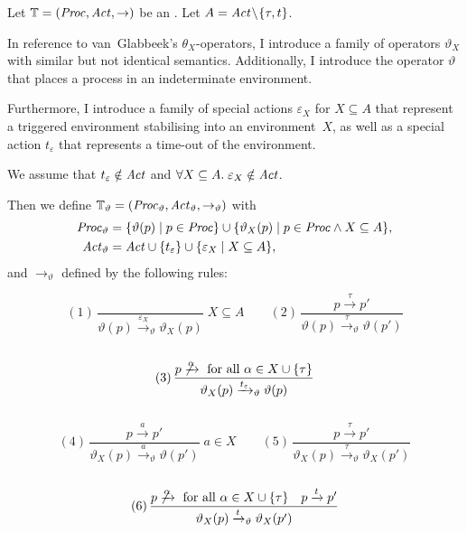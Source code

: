 %
\begin{isabellebody}%
%
%
\isadelimtheory
%
\endisadelimtheory
%
\isatagtheory
%
\endisatagtheory
{\isafoldtheory}%
%
\isadelimtheory
%
\endisadelimtheory
%
\isadelimdocument
%
\endisadelimdocument
%
\isatagdocument
%
\isamarkuptrue%
%
\endisatagdocument
{\isafolddocument}%
%
\isadelimdocument
%
\endisadelimdocument
%
\begin{isamarkuptext}%
\label{sec:mapping_lts}%
\end{isamarkuptext}\isamarkuptrue%
%
\begin{isamarkuptext}%
Let $\mathbb{T} = (\mathit{Proc}, \mathit{Act}, \rightarrow)$ be an \LTSt{}. Let $A = \mathit{Act} \!\setminus\! \{\tau, t\}$.

In reference to van~Glabbeek's $\theta_X$-operators, I introduce a family of operators $\vartheta_X$ with similar but not identical semantics. Additionally, I introduce the operator $\vartheta$ that places a process in an indeterminate environment.

Furthermore, I introduce a family of special actions $\varepsilon_X$ for $X \subseteq A$ that represent a triggered environment stabilising into an environment~$X$, as well as a special action $t_\varepsilon$ that represents a time-out of the environment.

We assume that $t_\varepsilon \notin \mathit{Act}$ and $\forall X \subseteq A.\; \varepsilon_X \notin \mathit{Act}$. 

Then we define $\mathbb{T}_\vartheta = (\mathit{Proc}_\vartheta, \mathit{Act}_\vartheta, \rightarrow_\vartheta)$ with
\begin{align*}
    \mathit{Proc}_\vartheta &= \{ \vartheta(p) \mid p \in \mathit{Proc} \} \cup \{ \vartheta_X(p) \mid p \in \mathit{Proc} \wedge X \subseteq A \}, \\
    \mathit{Act}_\vartheta &= \mathit{Act} \cup \{t_\varepsilon\} \cup \{ \varepsilon_X \mid X \subseteq A \},
\end{align*}
and $\rightarrow_\vartheta$ defined by the following rules:

$$
(1)\,\frac{}{\vartheta(p) \xrightarrow{\varepsilon_X}_\vartheta \vartheta_X(p)} \; X \subseteq A
\qquad
(2)\,\frac{p \xrightarrow{\tau} p'}{\vartheta(p) \xrightarrow{\tau}_\vartheta \vartheta(p')}
$$
\\[-5pt]
$$
(3)\,\frac{p \not\xrightarrow{\alpha} \text{ for all } \alpha \in X \cup \{\tau\}}
{\vartheta_X(p) \xrightarrow{t_\varepsilon}_\vartheta \vartheta(p)}
$$
\\[-5pt]
$$
(4)\,\frac{p \xrightarrow{a} p'}{\vartheta_X(p) \xrightarrow{a}_\vartheta \vartheta(p')} \; a \in X
\qquad
(5)\,\frac{p \xrightarrow{\tau} p'}{\vartheta_X(p) \xrightarrow{\tau}_\vartheta \vartheta_X(p')}
$$
\\[-5pt]
$$
(6)\,\frac{p \not\xrightarrow{\alpha} \text{ for all } \alpha \in X \cup \{\tau\} \quad p \xrightarrow{t} p'}
{\vartheta_X(p) \xrightarrow{t}_\vartheta \vartheta_X(p')}
$$\\


\end{isamarkuptext}
\end{isabellebody}
